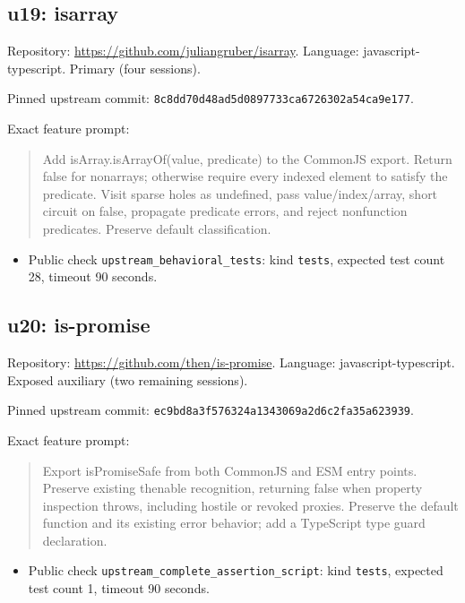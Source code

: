 \documentclass[manuscript,screen,nonacm]{acmart}
\providecommand{\tightlist}{\setlength{\itemsep}{0pt}\setlength{\parskip}{0pt}}
\begin{document}
\subsection{u19: isarray}\label{u19-isarray}

Repository: \url{https://github.com/juliangruber/isarray}. Language:
javascript-typescript. Primary (four sessions).

Pinned upstream commit:
\nolinkurl{8c8dd70d48ad5d0897733ca6726302a54ca9e177}.

Exact feature prompt:

\begin{quote}
Add isArray.isArrayOf(value, predicate) to the CommonJS export. Return
false for nonarrays; otherwise require every indexed element to satisfy
the predicate. Visit sparse holes as undefined, pass value/index/array,
short circuit on false, propagate predicate errors, and reject
nonfunction predicates. Preserve default classification.
\end{quote}

\begin{itemize}
\tightlist
\item
  Public check \nolinkurl{upstream_behavioral_tests}: kind
  \texttt{tests}, expected test count 28, timeout 90 seconds.
\end{itemize}

\subsection{u20: is-promise}\label{u20-is-promise}

Repository: \url{https://github.com/then/is-promise}. Language:
javascript-typescript. Exposed auxiliary (two remaining sessions).

Pinned upstream commit:
\nolinkurl{ec9bd8a3f576324a1343069a2d6c2fa35a623939}.

Exact feature prompt:

\begin{quote}
Export isPromiseSafe from both CommonJS and ESM entry points. Preserve
existing thenable recognition, returning false when property inspection
throws, including hostile or revoked proxies. Preserve the default
function and its existing error behavior; add a TypeScript type guard
declaration.
\end{quote}

\begin{itemize}
\tightlist
\item
  Public check \nolinkurl{upstream_complete_assertion_script}: kind
  \texttt{tests}, expected test count 1, timeout 90 seconds.
\end{itemize}
\end{document}
